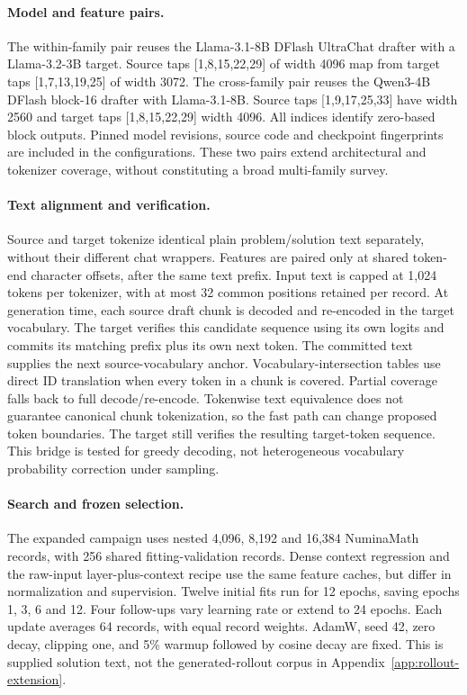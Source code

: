 \documentclass{article}
\begin{document}
\paragraph{Model and feature pairs.}
The within-family pair reuses the Llama-3.1-8B DFlash UltraChat drafter
with a Llama-3.2-3B target. Source taps [1,8,15,22,29] of width 4096 map
from target taps [1,7,13,19,25] of width 3072. The cross-family pair
reuses the Qwen3-4B DFlash block-16 drafter with Llama-3.1-8B. Source taps
[1,9,17,25,33] have width 2560 and target taps [1,8,15,22,29] width 4096.
All indices identify zero-based block outputs. Pinned model revisions,
source code and checkpoint fingerprints are included in the configurations.
These two pairs extend architectural and tokenizer coverage, without
constituting a broad multi-family survey.

\paragraph{Text alignment and verification.}
Source and target tokenize identical plain problem/solution text separately,
without their different chat wrappers. Features are paired only at shared
token-end character offsets, after the same text prefix. Input text is
capped at 1,024 tokens per tokenizer, with at most 32 common positions
retained per record. At generation time, each source draft chunk is decoded
and re-encoded in the target vocabulary. The target verifies this candidate
sequence using its own logits and commits its matching prefix plus its own
next token. The committed text supplies the next source-vocabulary anchor.
Vocabulary-intersection tables use direct ID translation when every token
in a chunk is covered. Partial coverage falls back to full decode/re-encode.
Tokenwise text equivalence does not guarantee canonical chunk tokenization,
so the fast path can change proposed token boundaries. The target still
verifies the resulting target-token sequence. This bridge is tested for greedy decoding, not heterogeneous
vocabulary probability correction under sampling.

\paragraph{Search and frozen selection.}
The expanded campaign uses nested 4,096, 8,192 and 16,384 NuminaMath records,
with 256 shared fitting-validation records. Dense context regression and
the raw-input layer-plus-context recipe use the same feature caches, but
differ in normalization and supervision. Twelve initial fits run for
12 epochs, saving epochs 1, 3, 6 and 12. Four follow-ups vary learning
rate or extend to 24 epochs. Each update averages 64 records, with equal
record weights. AdamW, seed 42, zero decay, clipping one, and 5\% warmup
followed by cosine decay are fixed. This is supplied solution text,
not the generated-rollout corpus in Appendix~\ref{app:rollout-extension}.
\end{document}
